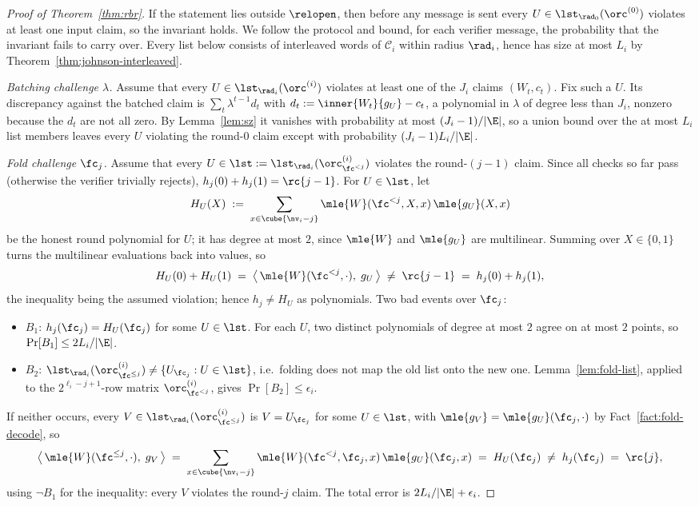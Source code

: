 \begin{proof}[Proof of Theorem~\ref{thm:rbr}]
If the statement lies outside $\relopen$, then before any message is sent every $U \in \lst_{\rad_0}(\orc^{(0)})$ violates at least one input claim, so the invariant holds. We follow the protocol and bound, for each verifier message, the probability that the invariant fails to carry over. Every list below consists of interleaved words of $\mathcal{C}_i$ within radius $\rad_i$, hence has size at most $L_i$ by Theorem~\ref{thm:johnson-interleaved}.

\medskip\noindent\emph{Batching challenge $\lambda$.}
Assume that every $U \in \lst_{\rad_i}(\orc^{(i)})$ violates at least one of the $J_i$ claims $(W_t, c_t)$. Fix such a $U$. Its discrepancy against the batched claim is $\sum_{t} \lambda^{t - 1} d_t$ with $d_t := \inner{W_t}{g_U} - c_t$, a polynomial in $\lambda$ of degree less than $J_i$, nonzero because the $d_t$ are not all zero. By Lemma~\ref{lem:sz} it vanishes with probability at most $(J_i - 1)/|\E|$, so a union bound over the at most $L_i$ list members leaves every $U$ violating the round-$0$ claim except with probability $(J_i - 1) L_i / |\E|$.

\medskip\noindent\emph{Fold challenge $\fc_j$.}
Assume that every $U \in \lst := \lst_{\rad_i}(\orc^{(i)}_{\fc^{<j}})$ violates the round-$(j{-}1)$ claim. Since all checks so far pass (otherwise the verifier trivially rejects), $h_j(0) + h_j(1) = \rc{j-1}$. For $U \in \lst$, let
\[
H_U(X) \;:=\; \sum_{x \in \cube{\nv_i - j}} \mle{W}(\fc^{<j}, X, x)\, \mle{g_U}(X, x)
\]
be the honest round polynomial for $U$; it has degree at most $2$, since $\mle{W}$ and $\mle{g_U}$ are multilinear. Summing over $X \in \{0, 1\}$ turns the multilinear evaluations back into values, so
\[
H_U(0) + H_U(1) \;=\; \bigl\langle\, \mle{W}(\fc^{<j}, \cdot),\; g_U \,\bigr\rangle \;\neq\; \rc{j-1} \;=\; h_j(0) + h_j(1),
\]
the inequality being the assumed violation; hence $h_j \neq H_U$ as polynomials. Two bad events over $\fc_j$:
\begin{itemize}[itemsep=1pt]
\item $B_1$: $h_j(\fc_j) = H_U(\fc_j)$ for some $U \in \lst$. For each $U$, two distinct polynomials of degree at most $2$ agree on at most $2$ points, so $\Pr[B_1] \le 2 L_i / |\E|$.
\item $B_2$: $\lst_{\rad_i}(\orc^{(i)}_{\fc^{\le j}}) \neq \{ U_{\fc_j} : U \in \lst \}$, i.e.\ folding does not map the old list onto the new one. Lemma~\ref{lem:fold-list}, applied to the $2^{\ell_i - j + 1}$-row matrix $\orc^{(i)}_{\fc^{<j}}$, gives $\Pr[B_2] \le \epsilon_i$.
\end{itemize}
If neither occurs, every $V \in \lst_{\rad_i}(\orc^{(i)}_{\fc^{\le j}})$ is $V = U_{\fc_j}$ for some $U \in \lst$, with $\mle{g_V} = \mle{g_U}(\fc_j, \cdot)$ by Fact~\ref{fact:fold-decode}, so
\[
\bigl\langle\, \mle{W}(\fc^{\le j}, \cdot),\; g_V \,\bigr\rangle
\;=\; \sum_{x \in \cube{\nv_i - j}} \mle{W}(\fc^{<j}, \fc_j, x)\, \mle{g_U}(\fc_j, x)
\;=\; H_U(\fc_j) \;\neq\; h_j(\fc_j) \;=\; \rc{j} ,
\]
using $\neg B_1$ for the inequality: every $V$ violates the round-$j$ claim. The total error is $2 L_i/|\E| + \epsilon_i$.


\end{proof}

